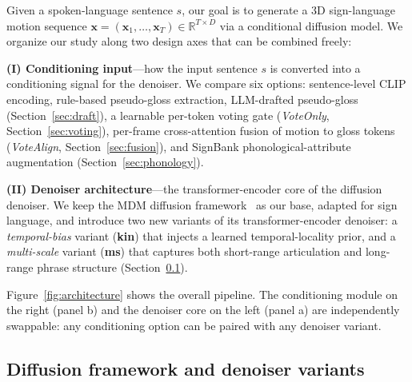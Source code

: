 \documentclass{article}
\begin{document}
Given a spoken-language sentence $s$, our goal is to generate a 3D sign-language motion sequence $\mathbf{x} = (\mathbf{x}_1, \ldots, \mathbf{x}_T) \in \mathbb{R}^{T \times D}$ via a conditional diffusion model. We organize our study along two design axes that can be combined freely:

\textbf{(I) Conditioning input}---how the input sentence $s$ is converted into a conditioning signal for the denoiser. We compare six options: sentence-level CLIP encoding, rule-based pseudo-gloss extraction, LLM-drafted pseudo-gloss (Section~\ref{sec:draft}), a learnable per-token voting gate (\emph{VoteOnly}, Section~\ref{sec:voting}), per-frame cross-attention fusion of motion to gloss tokens (\emph{VoteAlign}, Section~\ref{sec:fusion}), and SignBank phonological-attribute augmentation (Section~\ref{sec:phonology}).

\textbf{(II) Denoiser architecture}---the transformer-encoder core of the diffusion denoiser. We keep the MDM diffusion framework~\citep{tevet2023human} as our base, adapted for sign language, and introduce two new variants of its transformer-encoder denoiser: a \emph{temporal-bias} variant (\textbf{kin}) that injects a learned temporal-locality prior, and a \emph{multi-scale} variant (\textbf{ms}) that captures both short-range articulation and long-range phrase structure (Section~\ref{sec:backbones}).

Figure~\ref{fig:architecture} shows the overall pipeline. The conditioning module on the right (panel b) and the denoiser core on the left (panel a) are independently swappable: any conditioning option can be paired with any denoiser variant.

\subsection{Diffusion framework and denoiser variants}
\label{sec:backbones}
\end{document}
